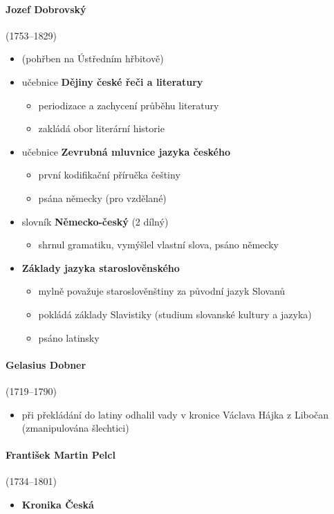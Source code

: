 \paragraph{Jozef Dobrovský}(1753--1829)
\begin{itemize}
\item (pohřben na Ústředním hřbitově)
\item učebnice \textbf{Dějiny české řeči a literatury}
	\begin{itemize}
	\item periodizace a zachycení průběhu literatury
	\item zakládá obor literární historie
	\end{itemize}
\item učebnice \textbf{Zevrubná mluvnice jazyka českého}
	\begin{itemize}
	\item první kodifikační příručka češtiny
	\item psána německy (pro vzdělané)
	\end{itemize}
\item slovník \textbf{Německo-český} (2 dílný)
	\begin{itemize}
	\item shrnul gramatiku, vymýšlel vlastní slova, psáno německy
	\end{itemize}
\item \textbf{Základy jazyka staroslověnského}
	\begin{itemize}
	\item mylně považuje staroslověnštiny za původní jazyk Slovanů
	\item pokládá základy Slavistiky (studium slovanské kultury a jazyka)
	\item psáno latinsky
	\end{itemize}
\end{itemize}

\paragraph{Gelasius Dobner}(1719--1790)
	\begin{itemize}
	\item při překládání do latiny odhalil vady v kronice Václava Hájka z Libočan (zmanipulována šlechtici)
	\end{itemize}
	
\paragraph{František Martin Pelcl} (1734--1801)
	\begin{itemize}
	\item \textbf{Kronika Česká}
	\end{itemize}
	
